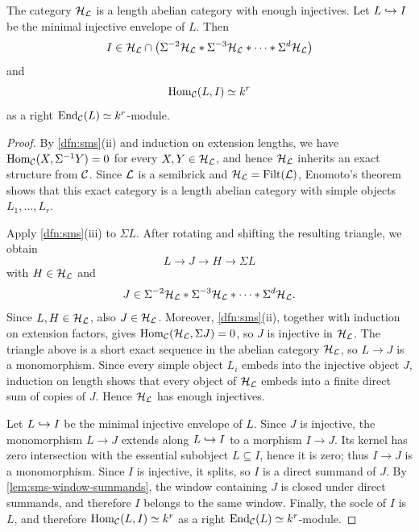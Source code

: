 \documentclass[11pt,a4paper,dvipsnames,x11names]{amsart}
\begin{document}
\begin{lem}\label{lem:injectives}
The category $\mathcal H_{\mathcal L}$ is a length abelian category with enough injectives. Let $L\hookrightarrow I$ be the minimal injective envelope of $L$. Then
\[
I\in\mathcal H_{\mathcal L}\cap\bigl(\Sigma^{-2}\mathcal H_{\mathcal L}*\Sigma^{-3}\mathcal H_{\mathcal L}*\cdots*\Sigma^{d}\mathcal H_{\mathcal L}\bigr)
\]
and
\[
\operatorname{Hom}_{\mathcal C}(L,I)\simeq k^r
\]
as a right $\operatorname{End}_{\mathcal C}(L)\simeq k^r$-module.
\end{lem}
\begin{proof}
By \cref{dfn:sms}(ii) and induction on extension lengths, we have $\operatorname{Hom}_\mathcal C(X,\Sigma^{-1}Y)=0$ for every $X,Y\in\mathcal H_\mathcal L$, and hence $\mathcal H_\mathcal L$ inherits an exact structure from $\mathcal C$. Since $\mathcal L$ is a semibrick and $\mathcal H_{\mathcal L}=\operatorname{Filt}(\mathcal L)$, Enomoto's theorem \cite{Enomoto21} shows that this exact category is a length abelian category with simple objects $L_1,\dots,L_r$.

Apply \cref{dfn:sms}(iii) to $\Sigma L$. After rotating and shifting the resulting triangle, we obtain
\[
L\longrightarrow J\longrightarrow H\longrightarrow\Sigma L
\]
with $H\in\mathcal H_\mathcal L$ and
\[
J\in\Sigma^{-2}\mathcal H_{\mathcal L}*\Sigma^{-3}\mathcal H_{\mathcal L}*\cdots*\Sigma^{d}\mathcal H_{\mathcal L}.
\]
Since $L,H\in\mathcal H_\mathcal L$, also $J\in\mathcal H_\mathcal L$. Moreover, \cref{dfn:sms}(ii), together with induction on extension factors, gives $\operatorname{Hom}_\mathcal C(\mathcal H_\mathcal L,\Sigma J)=0$, so $J$ is injective in $\mathcal H_\mathcal L$. The triangle above is a short exact sequence in the abelian category $\mathcal H_\mathcal L$, so $L\to J$ is a monomorphism. Since every simple object $L_i$ embeds into the injective object $J$, induction on length shows that every object of $\mathcal H_\mathcal L$ embeds into a finite direct sum of copies of $J$. Hence $\mathcal H_\mathcal L$ has enough injectives.

Let $L\hookrightarrow I$ be the minimal injective envelope of $L$. Since $J$ is injective, the monomorphism $L\to J$ extends along $L\hookrightarrow I$ to a morphism $I\to J$. Its kernel has zero intersection with the essential subobject $L\subseteq I$, hence it is zero; thus $I\to J$ is a monomorphism. Since $I$ is injective, it splits, so $I$ is a direct summand of $J$. By \cref{lem:sms-window-summands}, the window containing $J$ is closed under direct summands, and therefore $I$ belongs to the same window. Finally, the socle of $I$ is $L$, and therefore $\operatorname{Hom}_\mathcal C(L,I)\simeq k^r$ as a right $\operatorname{End}_\mathcal C(L)\simeq k^r$-module.
\end{proof}
\end{document}
